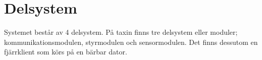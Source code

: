 \documentclass[designspec/spec.tex]{subfiles}
\begin{document}
\section{Delsystem}
Systemet består av 4 delsystem. På taxin finns tre delsystem eller moduler;
kommunikationsmodulen, styrmodulen och sensormodulen. Det finns dessutom en
fjärrklient som körs på en bärbar dator.





\end{document}
